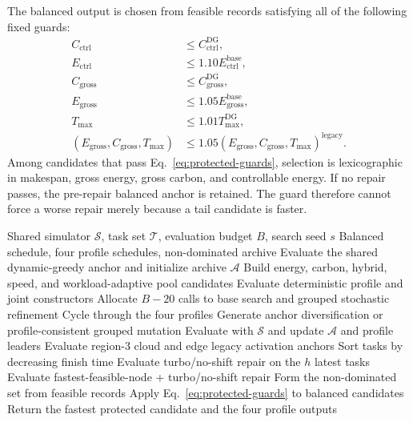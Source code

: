 The balanced output is chosen from feasible records satisfying all of the following fixed guards:
\begin{align}
C_{\mathrm{ctrl}} &\le C_{\mathrm{ctrl}}^{\mathrm{DG}}, \\
E_{\mathrm{ctrl}} &\le 1.10 E_{\mathrm{ctrl}}^{\mathrm{base}}, \\
C_{\mathrm{gross}} &\le C_{\mathrm{gross}}^{\mathrm{DG}}, \\
E_{\mathrm{gross}} &\le 1.05 E_{\mathrm{gross}}^{\mathrm{base}}, \\
T_{\max} &\le 1.01 T_{\max}^{\mathrm{DG}}, \\
(E_{\mathrm{gross}},C_{\mathrm{gross}},T_{\max})
&\le 1.05(E_{\mathrm{gross}},C_{\mathrm{gross}},T_{\max})^{\mathrm{legacy}}.
\label{eq:protected-guards}
\end{align}
Among candidates that pass Eq.~\eqref{eq:protected-guards}, selection is lexicographic in makespan, gross energy, gross carbon, and controllable energy. If no repair passes, the pre-repair balanced anchor is retained. The guard therefore cannot force a worse repair merely because a tail candidate is faster.

\begin{algorithm}[t]
\caption{Guarded multi-profile search in \method}
\label{alg:hcsmo}
\begin{algorithmic}[1]
\Require Shared simulator $\mathcal{S}$, task set $\mathcal{T}$, evaluation budget $B$, search seed $s$
\Ensure Balanced schedule, four profile schedules, non-dominated archive
\State Evaluate the shared dynamic-greedy anchor and initialize archive $\mathcal{A}$
\State Build energy, carbon, hybrid, speed, and workload-adaptive pool candidates
\State Evaluate deterministic profile and joint constructors
\State Allocate $B-20$ calls to base search and grouped stochastic refinement
    \State Cycle through the four profiles
    \State Generate anchor diversification or profile-consistent grouped mutation
    \State Evaluate with $\mathcal{S}$ and update $\mathcal{A}$ and profile leaders
\EndWhile
\State Evaluate region-3 cloud and edge legacy activation anchors
    \State Sort tasks by decreasing finish time
        \State Evaluate turbo/no-shift repair on the $h$ latest tasks
        \State Evaluate fastest-feasible-node + turbo/no-shift repair
    \EndFor
\EndFor
\State Form the non-dominated set from feasible records
\State Apply Eq.~\eqref{eq:protected-guards} to balanced candidates
\State Return the fastest protected candidate and the four profile outputs
\end{algorithmic}
\end{algorithm}

